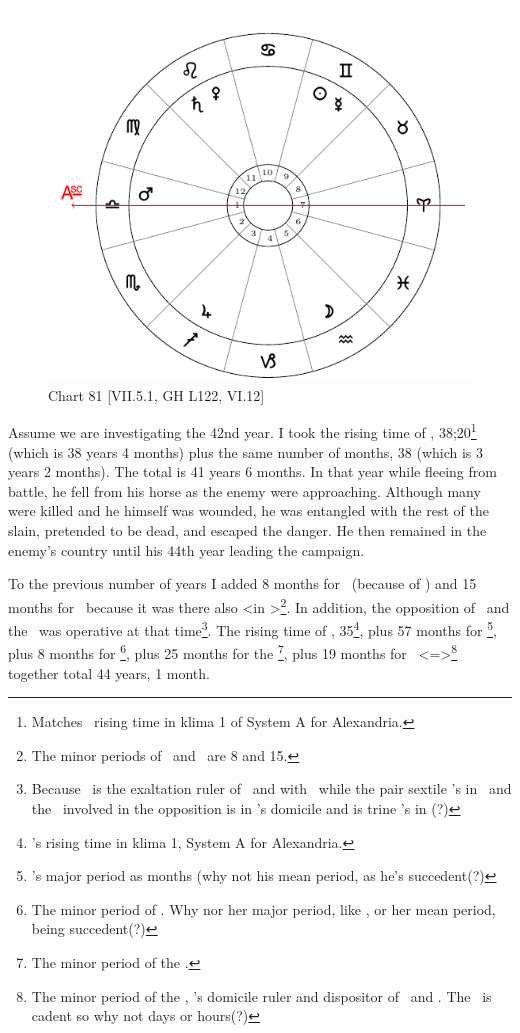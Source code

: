 \begin{figure}
\centering
\vspace{-1em}
\includegraphics[width=.68\textwidth]{charts/7_5_1}
\caption{Chart 81 [VII.5.1, GH L122, VI.12]}
\label{fig:chart81}
\end{figure} 

Assume we are investigating the 42nd year. I took the rising time of \Libra, 38;20\footnote{Matches \Libra\, rising time in klima 1 of System A for Alexandria.} (which is 38 years 4 months) plus the same number of months, 38 (which is 3 years 2 months). The total is 41 years 6 months. In that year while fleeing from battle, he fell from his horse as the enemy were approaching. Although many were killed and he himself was wounded, he was entangled with the rest of the slain, pretended to be dead, and escaped the danger. He then remained in the enemy’s country until his 44th year leading the campaign. 

To the previous number of years I added 8 months for \Venus\, (because of \Libra) and 15 months for \Mars\, because it was there also <in \Libra>\footnote{The minor periods of \Venus\, and \Mars\, are 8 and 15.}. In addition, the opposition of \Saturn\, and the \Moon\, was operative at that time\footnote{Because \Saturn\, is the exaltation ruler of \Libra\, and with \Venus\, while the pair sextile \Mars's in \Libra\, and the \Moon\, involved in the opposition is in \Saturn's domicile and is trine \Mars's in \Libra(?)}. The rising time of \Leo, 35\footnote{\Leo's rising time in klima 1, System A for Alexandria.}, plus 57 months for \Saturn\footnote{\Saturn's major period as months (why not his mean period, as he's succedent(?)}, plus 8 months for \Venus\footnote{The minor period of \Venus. Why nor her major period, like \Saturn, or her mean period, being succedent(?)}, plus 25 months for the \Moon\footnote{The minor period of the \Moon.}, plus 19 months for \Leo\, <=\Sun>\footnote{The minor period of the \Sun, \Leo's domicile ruler and dispositor of \Saturn\, and \Venus. The \Sun\, is cadent so why not days or hours(?)} together total 44 years, 1 month. 

